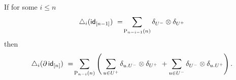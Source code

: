 
\begin{lemma} \label{lemma: boundary of triangle}
	If for some $i \leq n$
	\[
	\triangle_i(\mathsf{id}_{[n-1]})\ =\! \sum_{\mathrm{P}_{n-i-1}(n)} \delta_{U^-} \otimes \delta_{U^+}
	\]
	then
	\begin{align}
	\label{equation: triangle of boundary}
	\triangle_i (\partial \, \mathsf{id}_{[n]}) \ =\! \sum_{\mathrm{P}_{n-i}(n)} \left( \,
	\sum_{u \in U^+} \delta_{u.U^-} \otimes \delta_{U^+} \ +
	\sum_{u \in U^-} \delta_{U^-} \otimes \delta_{u.U^+} \right).
	\end{align}
\end{lemma}

